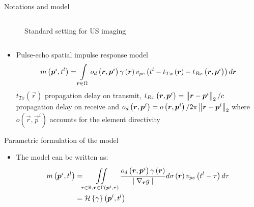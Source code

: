 {\begin{block}{Notations and model}
\begin{columns}
		\begin{column}{.52\textwidth} %
			\centering
			\begin{figure}
				{\footnotesize
				}
				\caption{Standard setting for US imaging}
			\end{figure}
		\end{column}
	\end{columns} %
	
	\begin{itemize}
		\item Pulse-echo spatial impulse response model
		\begin{align}
			m\left(\bm{p}^i, t^l\right)  = \int \limits_{\bm{r} \in \Omega} o_d \left(\bm{r}, \bm{p}^i\right) \gamma \left(\bm{r}\right) \nonumber v_{pe} \left(t^l - t_{Tx} \left(\bm{r}\right) - t_{Rx} \left( \bm{r}, \bm{p}^i \right) \right)  d\bm{r}
		\end{align} 
		$t_{Tx} \left(\vec{r}\right)$ propagation delay on transmit, $t_{Rx} \left( \bm{r}, \bm{p}^i  \right) = \left\lVert\bm{r} - \bm{p}^i\right\rVert_{2} / c$ propagation delay on receive and $o_d \left(\bm{r}, \bm{p}^i\right) = o \left(\bm{r}, \bm{p}^i\right) / 2 \pi \left\lVert\bm{r} - \bm{p}^i\right\rVert_{2}$ where $o \left(\vec{r}, \vec{p}^i\right)$ accounts for the element directivity
	\end{itemize}
\end{block}
\vfill 
\begin{block}{Parametric formulation of the model}
\begin{itemize}
	\item The model can be written as:
	\begin{align}
	\label{eq_inv_problem_cont_domain}
		m\left(\bm{p}^i, t^l\right) &= \iint \limits_{ \tau \in \mathbb{R}, \bm{r} \in \Gamma\left(\bm{p}^i, \tau\right)} \frac{o_d\left(\bm{r}, \bm{p}^i\right)\gamma \left(\bm{r}\right)}{\mid \nabla_{\bm{r}} g \mid} d \sigma \left(\bm{r}\right) v_{pe} \left(t^l - \tau\right) d \tau \nonumber \\
		&= \mathcal{H}\left\lbrace \gamma\right\rbrace \left(\bm{p}^i, t^l\right) 
	\end{align}

\end{itemize}
\end{block}}
